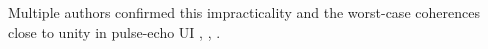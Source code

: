 Multiple authors confirmed
this impracticality
\cite{article:TillmannITIT2014} and
the worst-case coherences close to unity in
pulse-echo \ac{UI}
\cite[Fig. 6]{article:BessonITUFFC2018},
\cite[Table 1]{proc:BessonICIP2016},
\cite[Fig. 9]{article:DavidJASA2015}.

